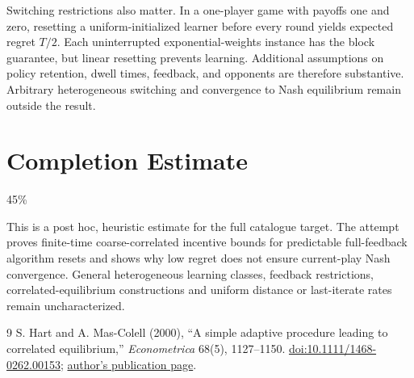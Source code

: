 \documentclass[11pt,a4paper]{article}
\theoremstyle{remark}
\begin{document}
Switching restrictions also matter. In a one-player game with payoffs one and zero, resetting a uniform-initialized learner before every round yields expected regret $T/2$. Each uninterrupted exponential-weights instance has the block guarantee, but linear resetting prevents learning. Additional assumptions on policy retention, dwell times, feedback, and opponents are therefore substantive. Arbitrary heterogeneous switching and convergence to Nash equilibrium remain outside the result.

\section{Completion Estimate}
45\%

This is a post hoc, heuristic estimate for the full catalogue target.
The attempt proves finite-time coarse-correlated incentive bounds for predictable full-feedback algorithm resets and shows why low regret does not ensure current-play Nash convergence. General heterogeneous learning classes, feedback restrictions, correlated-equilibrium constructions and uniform distance or last-iterate rates remain uncharacterized.

\begin{thebibliography}{9}
 S. Hart and A. Mas-Colell (2000), ``A simple adaptive procedure leading to correlated equilibrium,'' \emph{Econometrica} 68(5), 1127--1150. \href{https://doi.org/10.1111/1468-0262.00153}{doi:10.1111/1468-0262.00153}; \href{https://math.huji.ac.il/hart/abs/adapt.html}{author's publication page}.
\end{thebibliography}
\end{document}

